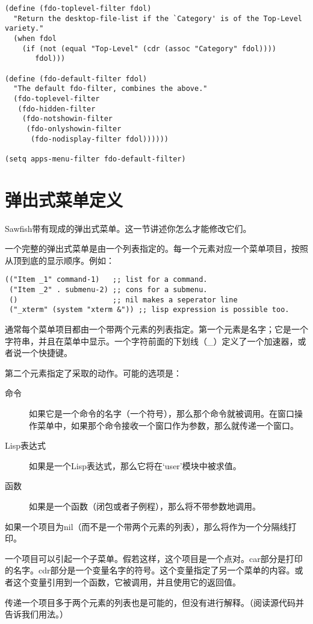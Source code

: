 \documentclass{book}
\begin{document}
\begin{CJK*}{UTF8}{gbsn}
\begin{verbatim}
(define (fdo-toplevel-filter fdol)
  "Return the desktop-file-list if the `Category' is of the Top-Level variety."
  (when fdol
    (if (not (equal "Top-Level" (cdr (assoc "Category" fdol))))
       fdol)))

(define (fdo-default-filter fdol)
  "The default fdo-filter, combines the above."
  (fdo-toplevel-filter
   (fdo-hidden-filter
    (fdo-notshowin-filter
     (fdo-onlyshowin-filter
      (fdo-nodisplay-filter fdol))))))

(setq apps-menu-filter fdo-default-filter)
\end{verbatim}
\section{弹出式菜单定义}
Sawfish带有现成的弹出式菜单。这一节讲述你怎么才能修改它们。

一个完整的弹出式菜单是由一个列表指定的。每一个元素对应一个菜单项目，按照从顶到底的显示顺序。例如：
\begin{verbatim}
(("Item _1" command-1)   ;; list for a command.
 ("Item _2" . submenu-2) ;; cons for a submenu.
 ()                      ;; nil makes a seperator line
 ("_xterm" (system "xterm &")) ;; lisp expression is possible too.
\end{verbatim}

通常每个菜单项目都由一个带两个元素的列表指定。第一个元素是名字；它是一个字符串，并且在菜单中显示。一个字符前面的下划线（\_）定义了一个加速器，或者说一个快捷键。

第二个元素指定了采取的动作。可能的选项是：
\begin{description}
\item[命令] 如果它是一个命令的名字（一个符号），那么那个命令就被调用。在窗口操作菜单中，如果那个命令接收一个窗口作为参数，那么就传递一个窗口。
\item[Lisp表达式] 如果是一个Lisp表达式，那么它将在`user'模块中被求值。
\item[函数] 如果是一个函数（闭包或者子例程），那么将不带参数地调用。
\end{description}
如果一个项目为nil（而不是一个带两个元素的列表），那么将作为一个分隔线打印。

一个项目可以引起一个子菜单。假若这样，这个项目是一个点对。car部分是打印的名字。cdr部分是一个变量名字的符号。这个变量指定了另一个菜单的内容。或者这个变量引用到一个函数，它被调用，并且使用它的返回值。

传递一个项目多于两个元素的列表也是可能的，但没有进行解释。（阅读源代码并告诉我们用法。）


\end{CJK*}
\end{document}
